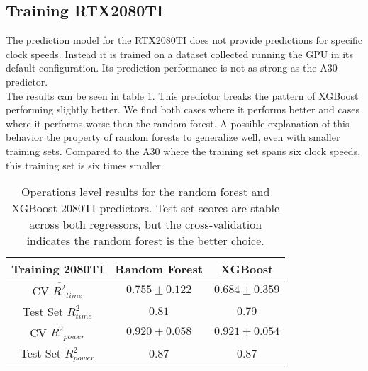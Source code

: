\subsection{Training RTX2080TI}

The prediction model for the RTX2080TI does not provide predictions for specific clock speeds. Instead it is trained on a dataset collected running the GPU in its default configuration. Its prediction performance is not as strong as the A30 predictor. \\
The results can be seen in table \ref{tab:pred_res_2080}. This predictor breaks the pattern of XGBoost performing slightly better. We find both cases where it performs better and cases where it performs worse than the random forest. A possible explanation of this behavior the property of random forests to generalize well, even with smaller training sets. Compared to the A30 where the training set spans six clock speeds, this training set is six times smaller. 


\begin{table}[h!]
\centering
\begin{tabular}{|c|c|c|}
\hline
 \textbf{Training 2080TI}& \textbf{Random Forest} & \textbf{XGBoost} \\
\hline
CV $\overline{R^2}_{time}$ & $0.755 \pm 0.122$ &  $0.684 \pm 0.359$ \\
\hline
Test Set $R^2_{time}$ & $0.81$ & $0.79$ \\
\hline
CV $\overline{R^2}_{power}$ & $0.920 \pm 0.058$  &  $0.921 \pm 0.054$\\
\hline
Test Set $R^2_{power}$ & $0.87$ & $0.87$ \\
\hline
\end{tabular}
\caption{Operations level results for the random forest and XGBoost 2080TI predictors. Test set scores are stable across both regressors, but the cross-validation indicates the random forest is the better choice.}




\label{tab:pred_res_2080}
\end{table}


